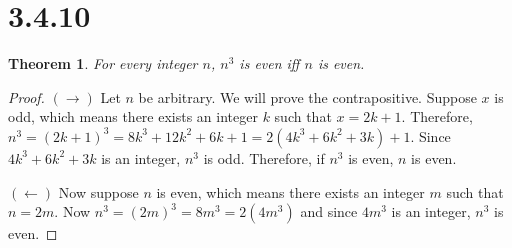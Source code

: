 \documentclass{article}
\newtheorem*{theorem}{Theorem}  %
\begin{document}
\section*{3.4.10}
\begin{theorem} For every integer $n$, $n^3$ is even iff $n$ is even.
\end{theorem}
\begin{proof}
$(\rightarrow)$ Let $n$ be arbitrary. We will prove the contrapositive. Suppose $x$ is odd, which means there exists an integer $k$ such that $x = 2k + 1$. Therefore, $n^3 = (2k + 1)^3 = 8k^3 + 12k^2 + 6k + 1 = 2(4k^3 + 6k^2 + 3k) + 1$. Since $4k^3 + 6k^2 + 3k$ is an integer, $n^3$ is odd. Therefore, if $n^3$ is even, $n$ is even.

$(\leftarrow)$ Now suppose $n$ is even, which means there exists an integer $m$ such that $n = 2m$. Now $n^3 = (2m)^3 = 8m^3 = 2(4m^3)$ and since $4m^3$ is an integer, $n^3$ is even.
\end{proof}
\end{document}
